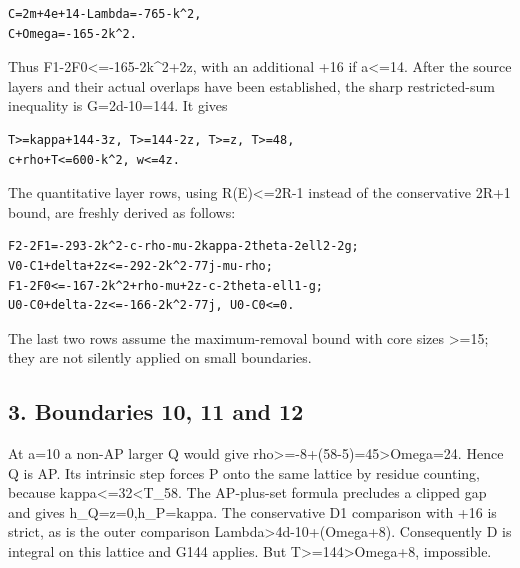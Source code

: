 \documentclass[10pt,a4paper]{article}
\theoremstyle{definition}
\begin{document}
\begin{lstlisting}
C=2m+4e+14-Lambda=-765-k^2,
C+Omega=-165-2k^2.
\end{lstlisting}

Thus F1-2F0\textless=\allowbreak{}-165-2k\^{}2+\allowbreak{}2z,\allowbreak{} with an additional +\allowbreak{}16 if
a\textless=\allowbreak{}14. After the source layers and their actual overlaps have
been established,\allowbreak{} the sharp restricted-sum inequality is G=\allowbreak{}2d-10=\allowbreak{}144. It
gives

\begin{lstlisting}
T>=kappa+144-3z, T>=144-2z, T>=z, T>=48,
c+rho+T<=600-k^2, w<=4z.
\end{lstlisting}

The quantitative layer rows,\allowbreak{} using \textbar R(E)\textbar\textless=\allowbreak{}2R-1
instead of the conservative 2R+\allowbreak{}1 bound,\allowbreak{} are freshly derived as follows:

\begin{lstlisting}
F2-2F1=-293-2k^2-c-rho-mu-2kappa-2theta-2ell2-2g;
V0-C1+delta+2z<=-292-2k^2-77j-mu-rho;
F1-2F0<=-167-2k^2+rho-mu+2z-c-2theta-ell1-g;
U0-C0+delta-2z<=-166-2k^2-77j, U0-C0<=0.
\end{lstlisting}

The last two rows assume the maximum-removal bound with core sizes
\textgreater=\allowbreak{}15; they are not silently applied on small boundaries.

\hypertarget{boundaries-10-11-and-12}{%
\subsection{3. Boundaries 10,\allowbreak{} 11 and 12}\label{boundaries-10-11-and-12}}

At a=\allowbreak{}10 a non-AP larger Q would give
rho\textgreater=\allowbreak{}-8+\allowbreak{}(58-5)=\allowbreak{}45\textgreater Omega=\allowbreak{}24. Hence Q is AP. Its
intrinsic step forces P onto the same lattice by residue counting,\allowbreak{}
because kappa\textless=\allowbreak{}32\textless T\_\allowbreak{}58. The AP-plus-set formula
precludes a clipped gap and gives h\_\allowbreak{}Q=\allowbreak{}z=\allowbreak{}0,\allowbreak{}h\_\allowbreak{}P=\allowbreak{}kappa. The conservative
D1 comparison with +\allowbreak{}16 is strict,\allowbreak{} as is the outer comparison
Lambda\textgreater4d-10+\allowbreak{}(Omega+\allowbreak{}8). Consequently D is integral on this
lattice and G144 applies. But T\textgreater=\allowbreak{}144\textgreater Omega+\allowbreak{}8,\allowbreak{}
impossible.
\end{document}
